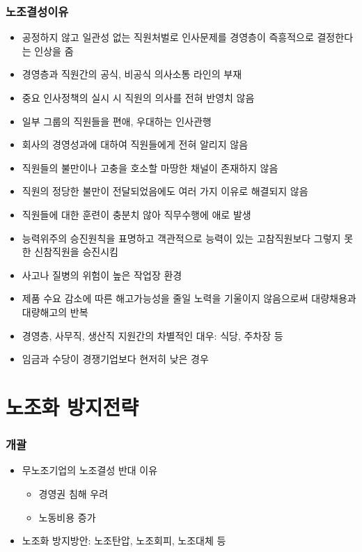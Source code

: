 \documentclass[aspectratio=169,xcolor=dvipsnames,handout]{beamer}
\begin{document}
\begin{frame}[allowframebreaks]
    \frametitle{노조결성이유}
    \begin{itemize}[<+->]
        \item 공정하지 않고 일관성 없는 직원처벌로 인사문제를 경영층이 즉흥적으로 결정한다는 인상을 줌
        \item 경영층과 직원간의 공식, 비공식 의사소통 라인의 부재
        \item 중요 인사정책의 실시 시 직원의 의사를 전혀 반영치 않음
        \item 일부 그룹의 직원들을 편애, 우대하는 인사관행
        \item 회사의 경영성과에 대하여 직원들에게 전혀 알리지 않음
        \item 직원들의 불만이나 고충을 호소할 마땅한 채널이 존재하지 않음
        \item 직원의 정당한 불만이 전달되었음에도 여러 가지 이유로 해결되지 않음
        \item 직원들에 대한 훈련이 충분치 않아 직무수행에 애로 발생
        \item 능력위주의 승진원칙을 표명하고 객관적으로 능력이 있는 고참직원보다 그렇지 못한 신참직원을 승진시킴
        \item 사고나 질병의 위험이 높은 작업장 환경
        \item 제품 수요 감소에 따른 해고가능성을 줄일 노력을 기울이지 않음으로써 대량채용과 대량해고의 반복
        \item 경영층, 사무직, 생산직 지원간의 차별적인 대우: 식당, 주차장 등
        \item 임금과 수당이 경쟁기업보다 현저히 낮은 경우
    \end{itemize}
\end{frame}

\section{노조화 방지전략}
\begin{frame}
    \frametitle{개괄}
    \begin{itemize}[<+->]
        \item 무노조기업의 노조결성 반대 이유
        \begin{itemize}
            \item 경영권 침해 우려
            \item 노동비용 증가
        \end{itemize}
        \item 노조화 방지방안: 노조탄압, 노조회피, 노조대체 등
    \end{itemize}
\end{frame}
\end{document}
